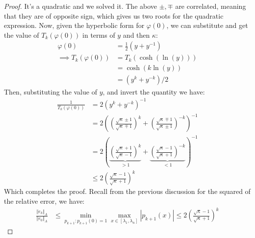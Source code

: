 \documentclass[]{article}
\theoremstyle{definition}
\begin{document}
\begin{proof}
                It's a quadratic and we solved it. The above $\pm, \mp$ are correlated, meaning that they are of opposite sign, which gives us two roots for the quadratic expression. Now, given the hyperbolic form for $\varphi(0)$, we can substitute and get the value of $T_k(\varphi(0))$ in terms of $y$ and then $\kappa$: 
                \begin{align}
                    \varphi(0)&= \frac{1}{2}(y + y^{-1})
                    \\
                    \implies 
                    T_k(\varphi(0)) &= 
                    T_k(\cosh(\ln(y)))
                    \\
                    &= \cosh(k\ln(y))
                    \\
                    &= (y^k + y^{-k})/2
                \end{align}
                Then, substituting the value of $y$, and invert the quantity we have: 
                \begin{align}
                    \frac{1}{T_k(\varphi(0))} &= 2(y^k + y^{-k})^{-1}
                    \\
                    &= 
                    2\left(
                        \left(
                            \frac{\sqrt{\kappa}\pm 1}{\sqrt{\kappa}\mp 1}
                        \right)^{k} + 
                        \left(
                            \frac{\sqrt{\kappa}\mp 1}{\sqrt{\kappa}\pm 1}
                        \right)^{-k}
                    \right)^{-1}
                    \\
                    &= 2\left(
                        \underbrace{\left(
                            \frac{\sqrt{\kappa}+ 1}{\sqrt{\kappa}- 1}
                        \right)^{k}}_{> 1} + 
                        \underbrace{\left(
                            \frac{\sqrt{\kappa}- 1}{\sqrt{\kappa}+ 1}
                        \right)^{-k}}_{ < 1}
                    \right)^{-1}\label{line:CG_Cheb_Bound}
                    \\
                    & \le 2 \left(
                        \frac{\sqrt{\kappa} - 1}{\sqrt{\kappa} + 1}
                    \right)^k
                \end{align}
                Which completes the proof. Recall from the previous discussion for the squared of the relative error, we have: 
                \begin{align}
                    \frac{\Vert e_k\Vert_A}{\Vert e_0\Vert_A} &\le 
                    \min_{p_{k + 1}: p_{k + 1}(0) = 1}\max_{x\in [\lambda_{1}, \lambda_{n}]} |p_{k + 1}(x)| \le 
                    2 \left(
                        \frac{\sqrt{\kappa} - 1}{\sqrt{\kappa} + 1}
                    \right)^k
                \end{align}

            \end{proof}
\end{document}
